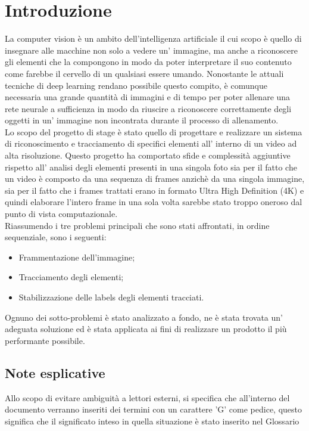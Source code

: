 \section{Introduzione}
La computer vision è un ambito dell'intelligenza artificiale il cui scopo è quello di insegnare alle macchine non solo a vedere un' immagine, ma anche a riconoscere gli elementi che la compongono in modo da poter interpretare il suo contenuto come farebbe il cervello di un qualsiasi essere umando. Nonostante le attuali tecniche di deep learning rendano possibile questo compito, è comunque necessaria una grande quantità di immagini e di tempo per poter allenare una rete neurale a sufficienza in modo da riuscire a riconoscere correttamente degli oggetti in un' immagine non incontrata durante il processo di allenamento.\\

Lo scopo del progetto di stage è stato quello di progettare e realizzare un sistema di riconoscimento e tracciamento di specifici elementi all' interno di un video ad alta risoluzione. Questo progetto ha comportato sfide e complessità aggiuntive rispetto all' analisi degli elementi presenti in una singola foto sia per il fatto che un video è composto da una sequenza di frames anzichè da una singola immagine, sia per il fatto che i frames trattati erano in formato Ultra High Definition (4K) e quindi elaborare l'intero frame in una sola volta sarebbe stato troppo oneroso dal punto di vista computazionale.\\

Riassumendo i tre problemi principali che sono stati affrontati, in ordine sequenziale, sono i seguenti:
\begin{itemize}
\item Frammentazione dell'immagine;
\item Tracciamento degli elementi;
\item Stabilizzazione delle labels degli elementi tracciati.
\end{itemize}
Ognuno dei sotto-problemi è stato analizzato a fondo, ne è stata trovata un' adeguata soluzione ed è stata applicata ai fini di realizzare un prodotto il più performante possibile.

\subsection{Note esplicative}
Allo scopo di evitare ambiguità a lettori esterni, si specifica che all'interno del documento verranno inseriti dei termini con un carattere 'G' come pedice, questo significa che il significato inteso in quella situazione è stato inserito nel Glossario

